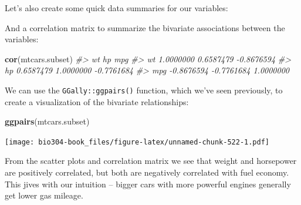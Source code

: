 \documentclass[]{book}
\newenvironment{Shaded}{\begin{snugshade}}{\end{snugshade}}
\newcommand{\CommentTok}[1]{\textcolor[rgb]{0.56,0.35,0.01}{\textit{#1}}}
\newcommand{\KeywordTok}[1]{\textcolor[rgb]{0.13,0.29,0.53}{\textbf{#1}}}
\newcommand{\NormalTok}[1]{#1}
\newcommand{\OperatorTok}[1]{\textcolor[rgb]{0.81,0.36,0.00}{\textbf{#1}}}
\newcommand{\StringTok}[1]{\textcolor[rgb]{0.31,0.60,0.02}{#1}}
\theoremstyle{definition}
\theoremstyle{definition}
\theoremstyle{definition}
\theoremstyle{remark}
\begin{document}
Let's also create some quick data summaries for our variables:

\begin{Shaded}
\end{Shaded}

And a correlation matrix to summarize the bivariate associations between
the variables:

\begin{Shaded}
\begin{Highlighting}[]
\KeywordTok{cor}\NormalTok{(mtcars.subset)}
\CommentTok{#>             wt         hp        mpg}
\CommentTok{#> wt   1.0000000  0.6587479 -0.8676594}
\CommentTok{#> hp   0.6587479  1.0000000 -0.7761684}
\CommentTok{#> mpg -0.8676594 -0.7761684  1.0000000}
\end{Highlighting}
\end{Shaded}

We can use the \texttt{GGally::ggpairs()} function, which we've seen
previously, to create a visualization of the bivariate relationships:

\begin{Shaded}
\begin{Highlighting}[]
\KeywordTok{ggpairs}\NormalTok{(mtcars.subset)}
\end{Highlighting}
\end{Shaded}

\texttt{[image: bio304-book\_files/figure-latex/unnamed-chunk-522-1.pdf]}

From the scatter plots and correlation matrix we see that weight and
horsepower are positively correlated, but both are negatively correlated
with fuel economy. This jives with our intuition -- bigger cars with
more powerful engines generally get lower gas mileage.
\end{document}
